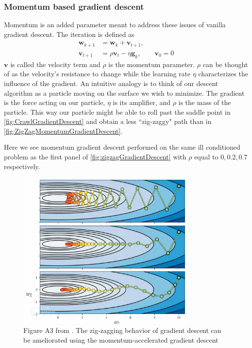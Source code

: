 \documentclass{article}
\theoremstyle{definition}
\begin{document}
\subsubsection{Momentum based gradient descent}
Momentum is an added parameter meant to address these issues of vanilla gradient descent. The iteration is defined as
\begin{equation}
\begin{aligned} 
    \boldsymbol{w}_{k+1} &= \boldsymbol{w}_k + \boldsymbol{v}_{t+1}, \\
    \boldsymbol{v}_{t+1} &= \rho \boldsymbol{v}_t - \eta \boldsymbol{g}_k, \qquad \boldsymbol{v}_0 = 0 
\end{aligned}
\label{eq:momentum_eq}
\end{equation}
$\boldsymbol{v}$ is called the velocity term and $\rho$ is the momentum parameter. $\rho$ can be thought of as the velocity's resistance to change while the learning rate $\eta$ characterizes the influence of the gradient. An intuitive analogy is to think of our descent algorithm as a particle moving on the surface we wish to minimize. The gradient is the force acting on our particle, $\eta$ is its amplifier, and $\rho$ is the mass of the particle. This way our particle might be able to roll past the saddle point in \autoref{fig:CrawlGradientDescent} and obtain a less ``zig-zaggy" path than in \autoref{fig:ZigZagMomentumGradientDescent}.

Here we see momentum gradient descent performed on the same ill conditioned problem as the first panel of \autoref{fig:zigzagGradientDescent} with $\rho$ equal to $0, 0.2, 0.7$ respectively.

\begin{figure}[H]
    \centering
    \includegraphics[width=0.8\textwidth]{Project2/figures/momentum_based_gradient_descent_less_zig.jpg.jpg}
    \caption{Figure A3 from \textcite[p.~478]{MLRefined}. The zig-zagging behavior of gradient descent can be ameliorated using the momentum-accelerated gradient descent}
    \label{fig:ZigZagMomentumGradientDescent}
\end{figure}
\end{document}
